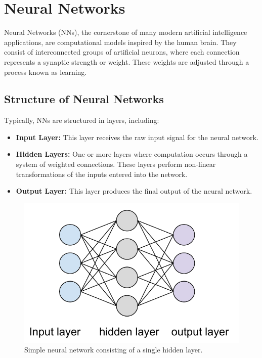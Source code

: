 

\section{Neural Networks}
Neural Networks (NNs), the cornerstone of many modern artificial intelligence applications, are computational models inspired by the human brain. They consist of interconnected groups of artificial neurons, where each connection represents a synaptic strength or weight. These weights are adjusted through a process known as learning.

\subsection{Structure of Neural Networks}
Typically, NNs are structured in layers, including:
\begin{itemize}
    \item \textbf{Input Layer:} This layer receives the raw input signal for the neural network.
    \item \textbf{Hidden Layers:} One or more layers where computation occurs through a system of weighted connections. These layers perform non-linear transformations of the inputs entered into the network.
    \item \textbf{Output Layer:} This layer produces the final output of the neural network.
\end{itemize}

\begin{figure}[H]
    \includegraphics[scale=0.7]{figures/figure-pdf/NN.pdf}
    \caption{Simple neural network consisting of a single hidden layer.}
\end{figure}

